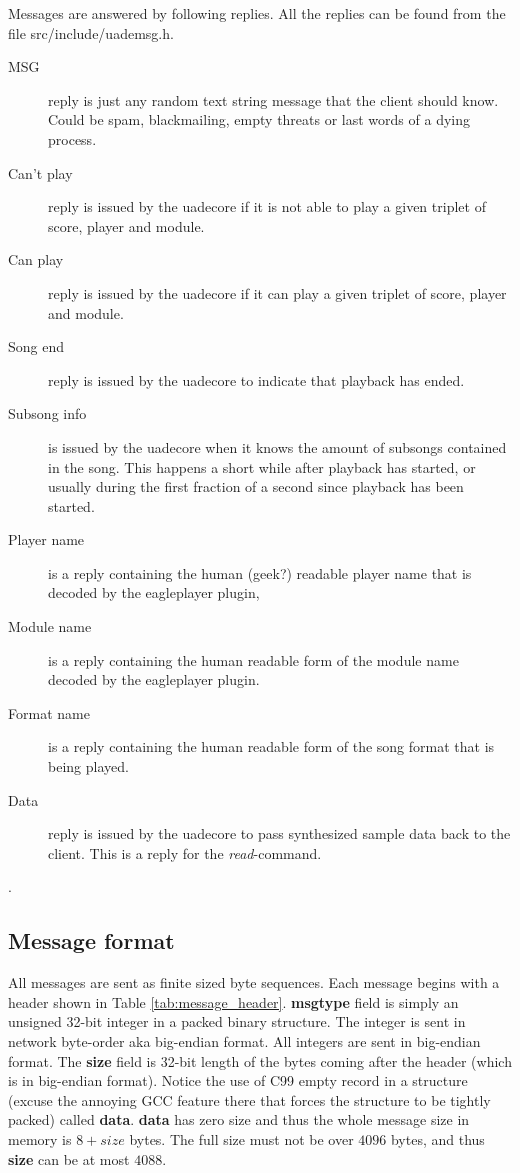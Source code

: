 \documentclass{article}
\begin{document}
Messages are answered by following replies.
All the replies can be found from the file \mbox{src/include/uademsg.h}.

\begin{description}
\item [MSG] reply is just any random text string message that the client should
know. Could be spam, blackmailing, empty threats or last words of a dying
process.
\item [Can't play] reply is issued by the uadecore if it is not able to play
a given triplet of score, player and module.
\item [Can play] reply is issued by the uadecore if it can play a given
triplet of score, player and module.
\item [Song end] reply is issued by the uadecore to indicate that playback
has ended.
\item [Subsong info] is issued by the uadecore when it knows the amount of
subsongs contained in the song. This happens a short while after playback
has started, or usually during the first fraction of a second since
playback has been started.
\item [Player name] is a reply containing the human (geek?) readable player
name that is decoded by the eagleplayer plugin,
\item [Module name] is a reply containing the human readable form of the
module name decoded by the eagleplayer plugin.
\item [Format name] is a reply containing the human readable form
of the song format that is being played.
\item [Data] reply is issued by the uadecore to pass synthesized sample
data back to the client. This is a reply for the \emph{read}-command.
\end{description}.

\subsection{Message format}
All messages are sent as finite sized byte sequences. Each message begins
with a header shown in Table \ref{tab:message_header}.
\textbf{msgtype} field is simply an unsigned 32-bit integer in a packed
binary structure. The integer is sent in network byte-order aka big-endian
format. All integers are sent in big-endian format.
The \textbf{size} field is 32-bit length of the bytes coming after the header
(which is in big-endian format).
Notice the use of C99 empty record in a structure (excuse the annoying GCC
feature there that forces the structure to be tightly packed) called
\textbf{data}. \textbf{data} has zero
size and thus the whole message size in memory is $8 + size$ bytes. The
full size must not be over $4096$ bytes, and thus \textbf{size} can be
at most $4088$.
\end{document}
